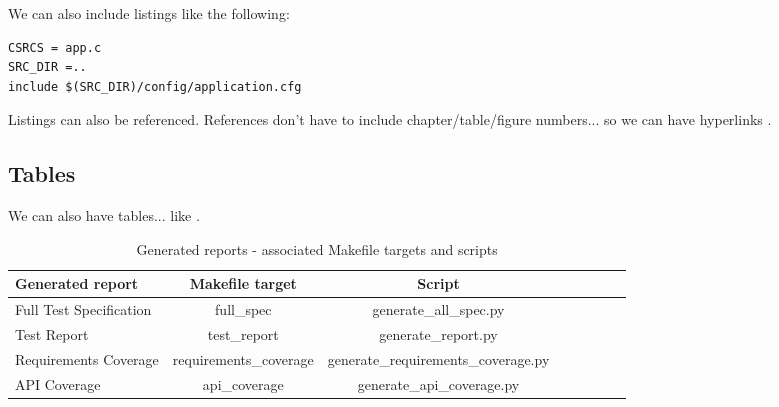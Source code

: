 We can also include listings like the following:

\lstset{language=make,caption=Application Makefile,label=lst:app-make}
\begin{lstlisting}
CSRCS = app.c
SRC_DIR =..
include $(SRC_DIR)/config/application.cfg
\end{lstlisting}

Listings can also be referenced. References don't have to include chapter/table/figure numbers... so we can have hyperlinks .

\subsection{Tables}

We can also have tables... like .

\begin{center}
\begin{table}[htb]
  \caption{Generated reports - associated Makefile targets and scripts}
  \begin{tabular}{l*{6}{c}r}
    Generated report & Makefile target & Script \\
    \hline
    Full Test Specification & full_spec & generate_all_spec.py  \\
    Test Report & test_report & generate_report.py  \\
    Requirements Coverage & requirements_coverage &
    generate_requirements_coverage.py   \\
    API Coverage & api_coverage & generate_api_coverage.py  \\
  \end{tabular}
  \label{table:reports}
\end{table}
\end{center}